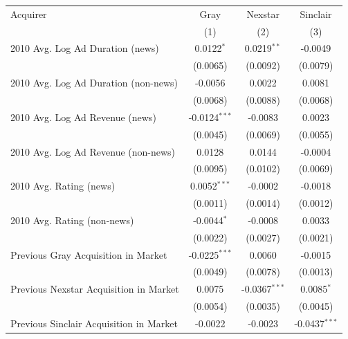 
\begingroup
\centering
\begin{tabular}{lccc}
   \toprule
   Acquirer                                & Gray            & Nexstar         & Sinclair\\  
                                           & (1)             & (2)             & (3)\\  
   \midrule 
   2010 Avg. Log Ad Duration (news)        & 0.0122$^{*}$    & 0.0219$^{**}$   & -0.0049\\   
                                           & (0.0065)        & (0.0092)        & (0.0079)\\   
   2010 Avg. Log Ad Duration (non-news)    & -0.0056         & 0.0022          & 0.0081\\   
                                           & (0.0068)        & (0.0088)        & (0.0068)\\   
   2010 Avg. Log Ad Revenue (news)         & -0.0124$^{***}$ & -0.0083         & 0.0023\\   
                                           & (0.0045)        & (0.0069)        & (0.0055)\\   
   2010 Avg. Log Ad Revenue (non-news)     & 0.0128          & 0.0144          & -0.0004\\   
                                           & (0.0095)        & (0.0102)        & (0.0069)\\   
   2010 Avg. Rating (news)                 & 0.0052$^{***}$  & -0.0002         & -0.0018\\   
                                           & (0.0011)        & (0.0014)        & (0.0012)\\   
   2010 Avg. Rating (non-news)             & -0.0044$^{*}$   & -0.0008         & 0.0033\\   
                                           & (0.0022)        & (0.0027)        & (0.0021)\\   
   Previous Gray Acquisition in Market     & -0.0225$^{***}$ & 0.0060          & -0.0015\\   
                                           & (0.0049)        & (0.0078)        & (0.0013)\\   
   Previous Nexstar Acquisition in Market  & 0.0075          & -0.0367$^{***}$ & 0.0085$^{*}$\\   
                                           & (0.0054)        & (0.0035)        & (0.0045)\\   
   Previous Sinclair Acquisition in Market & -0.0022         & -0.0023         & -0.0437$^{***}$\\   

\end{tabular}

